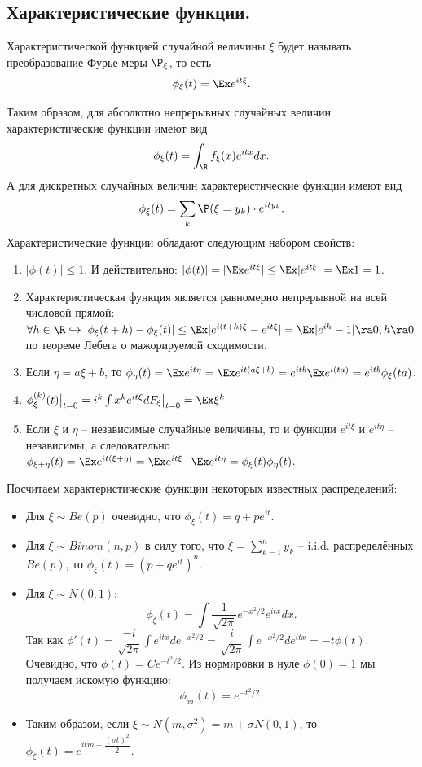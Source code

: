 \subsection{Характеристические функции.}
\begin{definition}
    Характеристической функцией случайной величины $\xi$ будет называть преобразование Фурье меры $\P_\xi$, то есть
    \[
        \phi_{\xi}(t) = \Ex e^{it \xi}.
    \]
\end{definition}
Таким образом, для абсолютно непрерывных случайных величин характеристические функции имеют вид
\[
    \phi_{\xi}(t) = \int_{\R} f_{\xi}(x)e^{itx}dx.
\]
А для дискретных случайных величин характеристические функции имеют вид
\[
    \phi_{\xi}(t) = \sum\limits_{k} \P(\xi = y_k)\cdot e^{ity_k}.
\]
Характеристические функции обладают следующим набором свойств:
\begin{enumerate}
    \item $|\phi(t)| \leq 1$. И действительно: $|\phi(t)| = |\Ex e^{it \xi}| \leq \Ex |e^{it \xi}| = \Ex 1 = 1$.
    \item Характеристическая функция является равномерно непрерывной на всей числовой прямой: $\forall h \in \R \hookrightarrow |\phi_\xi(t + h) - \phi_\xi(t)| \leq \Ex |e^{i(t + h)\xi} - e^{it \xi}| = \Ex |e^{ih} - 1| \ra 0, h \ra 0$ по теореме Лебега о мажорируемой сходимости.
    \item Если $\eta = a \xi + b$, то $\phi_{\eta}(t) = \Ex e^{it \eta} = \Ex e^{it (a \xi + b)} =e^{itb} \Ex e^{i (ta)} = e^{itb}\phi_\xi (ta) $.
    \item $\phi^{(k)}_\xi(t)\big|_{t = 0} = i^k \int x^k e^{it \xi} dF_\xi \big|_{t = 0} = \Ex \xi^k$
    \item Если $\xi$ и $\eta$ -- независимые случайные величины, то и функции $e^{it\xi}$ и $e^{it \eta}$ -- независимы, а следовательно $\phi_{\xi + \eta}(t) = \Ex e^{it (\xi + \eta)} = \Ex e^{it\xi}\cdot \Ex e^{it \eta} = \phi_\xi(t)\phi_\eta(t)$.
\end{enumerate}
\begin{example}
    Посчитаем характеристические функции некоторых известных распределений:
    \begin{itemize}
        \item Для $\xi \sim Be(p)$ очевидно, что $\phi_\xi(t) = q + pe^{it}$.
        \item Для $\xi \sim Binom(n, p)$ в силу того, что $\xi = \sum\limits_{k = 1}^n y_k$ -- i.i.d. распределённых $Be(p)$, то $\phi_\xi(t) = (p + qe^{it})^n$.
        \item Для $\xi \sim N(0, 1)$:
        \[
            \phi_{\xi}(t) = \int \dfrac{1}{\sqrt {2\pi}} e^{-x^2/2} e^{itx}dx.
        \]
        Так как $\phi'(t) = \dfrac{-i}{\sqrt {2\pi}} \int e^{itx}de^{-x^2/2} = \dfrac{i}{\sqrt {2\pi}} \int e^{-x^2/2}de^{itx} = -t \phi(t)$.
        Очевидно, что $\phi(t) = Ce^{-t^2/2}$. Из нормировки в нуле $\phi(0) = 1$ мы получаем искомую функцию:
        \[
            \phi_{xi}(t) = e^{-t^2/2}.
        \]
        \item Таким образом, если $\xi \sim N(m, \sigma^2) = m + \sigma N(0, 1)$, то $\phi_\xi(t) = e^{itm - \dfrac{(\sigma t)^2}{2}}$.
    \end{itemize}
\end{example}
